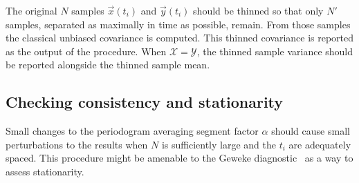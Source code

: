\documentclass[letterpaper,11pt,nointlimits,reqno]{amsart}
\begin{document}
The original $N$ samples $\vec{x}(t_i)$ and $\vec{y}(t_i)$ should be thinned so
that only $N'$ samples, separated as maximally in time as possible, remain.
From those samples the classical unbiased covariance is computed.  This thinned
covariance is reported as the output of the procedure.  When
$\mathscr{X}=\mathscr{Y}$, the thinned sample variance should be reported
alongside the thinned sample mean.

\subsection*{Checking consistency and stationarity}

Small changes to the periodogram averaging segment factor $\alpha$ should cause
small perturbations to the results when $N$ is sufficiently large and the $t_i$
are adequately spaced.  This procedure might be amenable to the Geweke
diagnostic~\citep{Geweke1992Evaluating} as a way to assess stationarity.

\newcommand*{\doi}[1]{\href{http://dx.doi.org/\detokenize{#1}}{doi: #1}}


\end{document}
